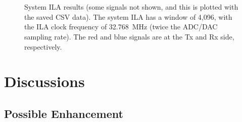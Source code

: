 \documentclass[journal,twoside]{IEEEtran}
\begin{document}
    \begin{figure}[!t]
      \setlength{\tabcolsep}{2pt}
      \\
      \\
      \caption{System ILA results (some signals not shown, and this is plotted with the saved CSV data).
        The system ILA has a window of 4,096, with the ILA clock frequency of \qty{32.768}{MHz} (twice the ADC/DAC sampling rate).
        The \textcolor{myred}{red} and \textcolor{myblued}{blue} signals are at the Tx and Rx side, respectively.
        }
      \label{fig:ila}
    \end{figure}

  \section{Discussions}

    \subsection{Possible Enhancement}
\end{document}
